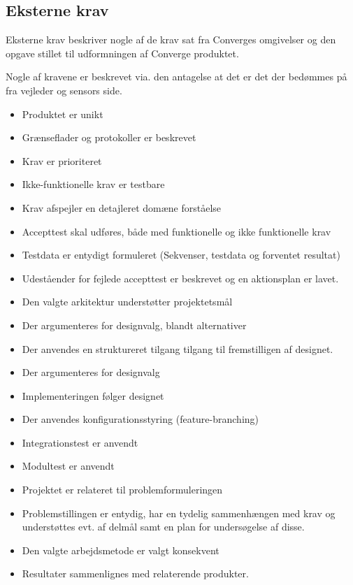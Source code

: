 \subsection{Eksterne krav}

Eksterne krav beskriver nogle af de krav sat fra Converges omgivelser og den opgave stillet til udformningen af Converge produktet.

Nogle af kravene er beskrevet via. den antagelse at det er det der bedømmes på fra vejleder og sensors side.


\begin{itemize}
  \item Produktet er unikt
  \item Grænseflader og protokoller er beskrevet
  \item Krav er prioriteret
  \item Ikke-funktionelle krav er testbare
  \item Krav afspejler en detajleret domæne forståelse
  \item Accepttest skal udføres, både med funktionelle og ikke funktionelle krav
  \item Testdata er entydigt formuleret (Sekvenser, testdata og forventet resultat)
  \item Udeståender for fejlede accepttest er beskrevet og en aktionsplan er lavet.
  \item Den valgte arkitektur understøtter projektetsmål
  \item Der argumenteres for designvalg, blandt alternativer
  \item Der anvendes en struktureret tilgang tilgang til fremstilligen af designet.
  \item Der argumenteres for designvalg
  \item Implementeringen følger designet
  \item Der anvendes konfigurationsstyring (feature-branching)
  \item Integrationstest er anvendt
  \item Modultest er anvendt
  \item Projektet er relateret til problemformuleringen
  \item Problemstillingen er entydig, har en tydelig sammenhængen med krav og understøttes evt. af delmål samt en plan for undersøgelse af disse.
  \item Den valgte arbejdsmetode er valgt konsekvent
  \item Resultater sammenlignes med relaterende produkter.
\end{itemize}